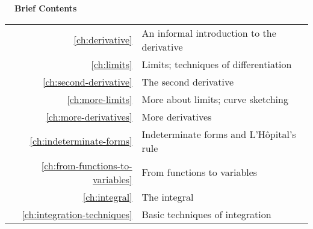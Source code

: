 \documentclass{fund}
\begin{document}
%

\cleardoublepage





\pagebreak\vspace{100mm}

\hbox{}\noindent\huge\bfseries\sffamily{}\hspace{-2mm}\ \ Brief Contents\\
\hspace{-20mm}\noindent\mynormaltype\Large\sffamily{}\begin{tabular}{rl}
\ref{ch:derivative} & An informal introduction to the derivative \quad \pageref{ch:derivative}\\
\ref{ch:limits} &  Limits; techniques of differentiation \quad \pageref{ch:limits}\\
\ref{ch:second-derivative} & The second derivative \quad \pageref{ch:second-derivative}\\
\ref{ch:more-limits} & More about limits; curve sketching\quad \pageref{ch:more-limits}\\
\ref{ch:more-derivatives} & More derivatives\quad \pageref{ch:more-derivatives}\\
\ref{ch:indeterminate-forms} & Indeterminate forms and L'H\^{o}pital's rule 
                  \quad \pageref{ch:indeterminate-forms} \\
\ref{ch:from-functions-to-variables} & From functions to variables
                  \quad \pageref{ch:from-functions-to-variables} \\
\ref{ch:integral} & The integral
                  \quad \pageref{ch:integral} \\
\ref{ch:integration-techniques} & 
                  Basic techniques of integration
                  \quad \pageref{ch:integration-techniques} \\
\end{tabular}
\mynormaltype

\vspace{100mm}\pagebreak

\cleardoublepage

\mynormaltype

\tableofcontents
\end{document}
